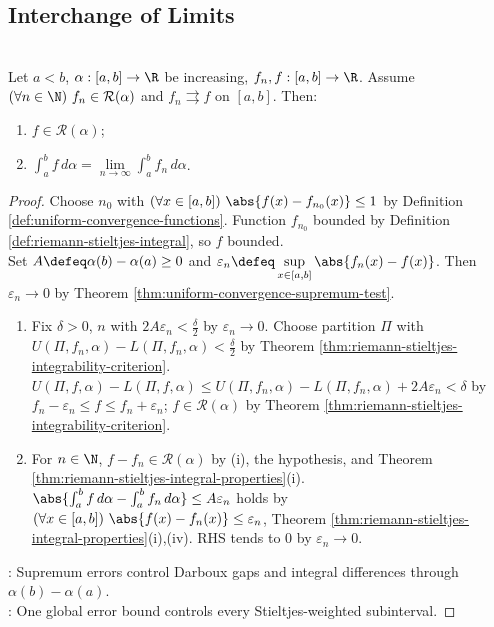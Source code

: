 \subsection{Interchange of Limits}

\begin{theorem} \label{thm:uniform-convergence-and-riemann-stieltjes-integration} \\
Let $a<b$, $\alpha:[a,b]\to\R$ be increasing, $f_n,f:[a,b]\to\R$. Assume $(\forall n\in\N)\ f_n\in\mathcal{R}(\alpha)$ and $f_n\rightrightarrows f$ on $[a,b]$. Then:
\begin{enumerate}[label=(\roman*)]
\setlength{\itemsep}{0pt}
\item $f\in\mathcal{R}(\alpha)$;
\item $\int_a^b f\,d\alpha=\lim\limits_{n\to\infty}\int_a^b f_n\,d\alpha$.
\end{enumerate}
\begin{proof}
Choose $n_0$ with $(\forall x\in[a,b])\ \abs{f(x)-f_{n_0}(x)}\leq1$ by Definition \ref{def:uniform-convergence-functions}. Function $f_{n_0}$ bounded by Definition \ref{def:riemann-stieltjes-integral}, so $f$ bounded.\\
Set $A\defeq\alpha(b)-\alpha(a)\geq0$ and $\varepsilon_n\defeq\sup\limits_{x\in[a,b]}\abs{f_n(x)-f(x)}$. Then $\varepsilon_n\to0$ by Theorem \ref{thm:uniform-convergence-supremum-test}.
\begin{enumerate}[label=(\roman*)]
\setlength{\itemsep}{0pt}
\item Fix $\delta>0$, $n$ with $2A\varepsilon_n<\frac{\delta}{2}$ by $\varepsilon_n\to0$. Choose partition $\Pi$ with $U(\Pi,f_n,\alpha)-L(\Pi,f_n,\alpha)<\frac{\delta}{2}$ by Theorem \ref{thm:riemann-stieltjes-integrability-criterion}.\\
$U(\Pi,f,\alpha)-L(\Pi,f,\alpha)\leq U(\Pi,f_n,\alpha)-L(\Pi,f_n,\alpha)+2A\varepsilon_n<\delta$ by $f_n-\varepsilon_n\leq f\leq f_n+\varepsilon_n$;  $f\in\mathcal{R}(\alpha)$ by Theorem \ref{thm:riemann-stieltjes-integrability-criterion}.
\item For $n\in\N$, $f-f_n\in\mathcal{R}(\alpha)$ by (i), the hypothesis, and Theorem \ref{thm:riemann-stieltjes-integral-properties}(i).\\
$\abs{\int_a^b f\,d\alpha-\int_a^b f_n\,d\alpha}\leq A\varepsilon_n$ holds by $(\forall x\in[a,b])\ \abs{f(x)-f_n(x)}\leq\varepsilon_n$, Theorem \ref{thm:riemann-stieltjes-integral-properties}(i),(iv). RHS tends to $0$ by $\varepsilon_n\to0$.
\end{enumerate}
: Supremum errors control Darboux gaps and integral differences through $\alpha(b)-\alpha(a)$.\\
: One global error bound controls every Stieltjes-weighted subinterval.
\end{proof}
\end{theorem}

